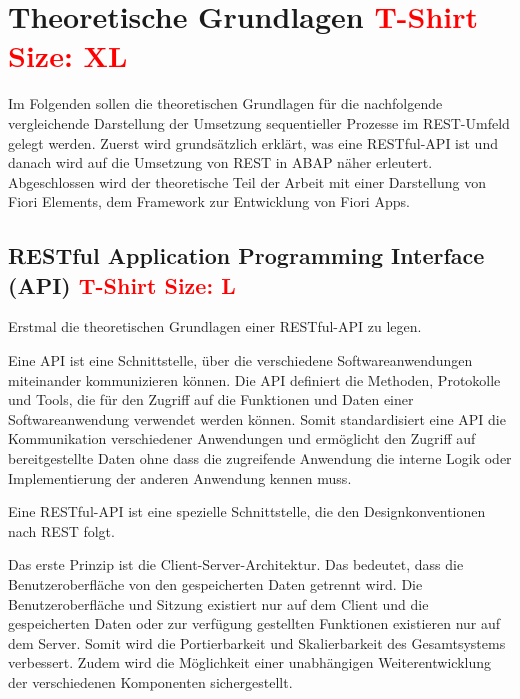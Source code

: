 \chapter{Theoretische Grundlagen \textcolor{red}{T-Shirt Size: XL}}

Im Folgenden sollen die theoretischen Grundlagen für die nachfolgende vergleichende Darstellung der Umsetzung sequentieller Prozesse im REST-Umfeld gelegt werden. Zuerst wird grundsätzlich erklärt, was eine RESTful-API ist und danach wird auf die Umsetzung von REST in ABAP näher erleutert. Abgeschlossen wird der theoretische Teil der Arbeit mit einer Darstellung von Fiori Elements, dem Framework zur Entwicklung von Fiori Apps.
\section{RESTful Application Programming Interface (API) \textcolor{red}{T-Shirt Size: L}}

Erstmal die theoretischen Grundlagen einer RESTful-API zu legen.

Eine API ist eine Schnittstelle, über die verschiedene Softwareanwendungen miteinander kommunizieren können. Die API definiert die Methoden, Protokolle und Tools, die für den Zugriff auf die Funktionen und Daten einer Softwareanwendung verwendet werden können. Somit standardisiert eine API die Kommunikation verschiedener Anwendungen und ermöglicht den Zugriff auf bereitgestellte Daten ohne dass die zugreifende Anwendung die interne Logik oder Implementierung der anderen Anwendung kennen muss.

Eine RESTful-API ist eine spezielle Schnittstelle, die den Designkonventionen nach REST folgt.

Das erste Prinzip ist die Client-Server-Architektur. Das bedeutet, dass die Benutzeroberfläche von den gespeicherten Daten getrennt wird. Die Benutzeroberfläche und Sitzung existiert nur auf dem Client und die gespeicherten Daten oder zur verfügung gestellten Funktionen existieren nur auf dem Server. Somit wird die Portierbarkeit und Skalierbarkeit des Gesamtsystems verbessert. Zudem wird die Möglichkeit einer unabhängigen Weiterentwicklung der verschiedenen Komponenten sichergestellt.

